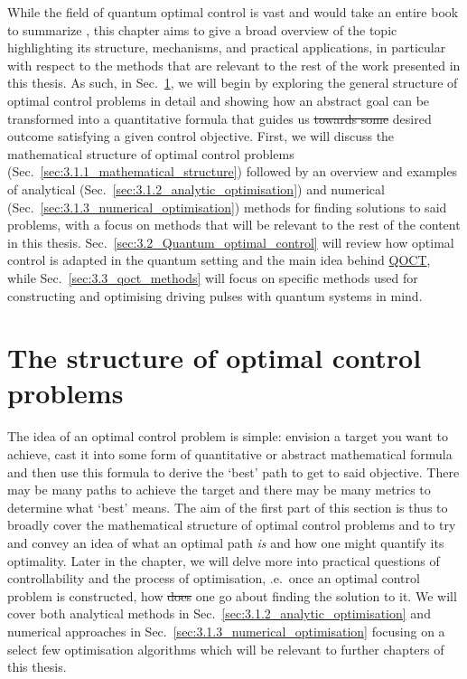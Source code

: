 \documentclass[a4paper,oneside,11pt]{book}
\newcommand{\acrref}[1]{\hyperref[acr:#1]{#1}}
\providecommand{\DIFaddtex}[1]{{\protect\color{blue}\uwave{#1}}} %
\providecommand{\DIFdeltex}[1]{{\protect\color{red}\sout{#1}}}                      %
\providecommand{\DIFaddbegin}{} %
\providecommand{\DIFaddend}{} %
\providecommand{\DIFdelbegin}{} %
\providecommand{\DIFdelend}{} %
\providecommand{\DIFadd}[1]{\texorpdfstring{\DIFaddtex{#1}}{#1}} %
\providecommand{\DIFdel}[1]{\texorpdfstring{\DIFdeltex{#1}}{}} %
\newcommand{\DIFscaledelfig}{0.5}
\newlength{\DIFdelgraphicswidth} %
\newlength{\DIFdelgraphicsheight} %
\newcommand{\DIFaddincludegraphics}[2][]{{\color{blue}\fbox{\DIFOincludegraphics[#1]{#2}}}} %
\newcommand{\DIFdelincludegraphics}[2][]{%
\sbox{\DIFdelgraphicsbox}{\DIFOincludegraphics[#1]{#2}}%
\settoboxwidth{\DIFdelgraphicswidth}{\DIFdelgraphicsbox} %
\settoboxtotalheight{\DIFdelgraphicsheight}{\DIFdelgraphicsbox} %
\scalebox{\DIFscaledelfig}{%
\parbox[b]{\DIFdelgraphicswidth}{\usebox{\DIFdelgraphicsbox}\\[-\baselineskip] \rule{\DIFdelgraphicswidth}{0em}}\llap{\resizebox{\DIFdelgraphicswidth}{\DIFdelgraphicsheight}{%
\setlength{\unitlength}{\DIFdelgraphicswidth}%
\begin{picture}(1,1)%
\thicklines\linethickness{2pt} %
{\color[rgb]{1,0,0}\put(0,0){\framebox(1,1){}}}%
{\color[rgb]{1,0,0}\put(0,0){\line( 1,1){1}}}%
{\color[rgb]{1,0,0}\put(0,1){\line(1,-1){1}}}%
\end{picture}%
}\hspace*{3pt}}} %
} %
\DeclareRobustCommand{\DIFaddbegin}{\DIFOaddbegin \let\includegraphics\DIFaddincludegraphics} %
\DeclareRobustCommand{\DIFaddend}{\DIFOaddend \let\includegraphics\DIFOincludegraphics} %
\DeclareRobustCommand{\DIFdelbegin}{\DIFOdelbegin \let\includegraphics\DIFdelincludegraphics} %
\DeclareRobustCommand{\DIFdelend}{\DIFOaddend \let\includegraphics\DIFOincludegraphics} %
\begin{document}
While the field of quantum optimal control is vast and would take an entire book to summarize \cite{dalessio_quantum_2016}, this chapter aims to give a broad overview of the topic highlighting its structure, mechanisms, and practical applications, in particular with respect to the methods that are relevant to the rest of the work presented in this thesis. As such, in Sec.~\ref{sec:3.1_structure_quantum_control}, we will begin by exploring the general structure of optimal control problems in detail and showing how an abstract goal can be transformed into a quantitative formula that guides us \DIFdelbegin \DIFdel{towards some }\DIFdelend \DIFaddbegin \DIFadd{toward a }\DIFaddend desired outcome satisfying a given control objective. First, we will discuss the mathematical structure of optimal control problems (Sec.~\ref{sec:3.1.1_mathematical_structure}) followed by an overview and examples of analytical (Sec.~\ref{sec:3.1.2_analytic_optimisation}) and numerical (Sec.~\ref{sec:3.1.3_numerical_optimisation}) methods for finding solutions to said problems, with a focus on methods that will be relevant to the rest of the content in this thesis. Sec.~\ref{sec:3.2_Quantum_optimal_control} will review how optimal control is adapted in the quantum setting and the main idea behind \acrref{QOCT}, while Sec.~\ref{sec:3.3_qoct_methods} will focus on specific methods used for constructing and optimising driving pulses with quantum systems in mind.

\section{The structure of optimal control problems}\label{sec:3.1_structure_quantum_control}

The idea of an optimal control problem is simple: envision a target you want to achieve, cast it into some form of quantitative or abstract mathematical formula and then use this formula to derive the `best' path to get to said objective. There may be many paths to achieve the target and there may be many metrics to determine what `best' means. The aim of the first part of this section is thus to broadly cover the mathematical structure of optimal control problems and to try and convey an idea of what an optimal path \emph{is} and how one might quantify its optimality. Later in the chapter, we will delve more into practical questions of controllability and the process of optimisation, \@i.e.~once an optimal control problem is constructed, how \DIFdelbegin \DIFdel{does }\DIFdelend \DIFaddbegin \DIFadd{could }\DIFaddend one go about finding the solution to it. We will cover both analytical methods in Sec.~\ref{sec:3.1.2_analytic_optimisation} and numerical approaches in Sec.~\ref{sec:3.1.3_numerical_optimisation} focusing on a select few optimisation algorithms which will be relevant to further chapters of this thesis. 
\end{document}
